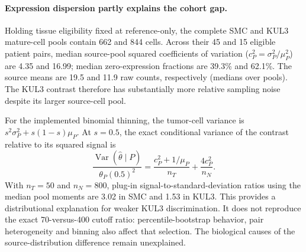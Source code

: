 \paragraph{Expression dispersion partly explains the cohort gap.}
\label{sec:cohortgap}
Holding tissue eligibility fixed at reference-only, the complete SMC and KUL3
mature-cell pools contain 662 and 844 cells. Across their 45 and 15 eligible
patient pairs, median source-pool squared coefficients of variation
($c_P^2=\sigma_P^2/\mu_P^2$) are 4.35 and 16.99; median zero-expression
fractions are 39.3\% and 62.1\%. The source means are 19.5 and 11.9 raw
counts, respectively (medians over pools). The KUL3 contrast therefore has
substantially more relative sampling noise despite its larger source-cell
pool.

For the implemented binomial thinning, the tumor-cell variance is
$s^2\sigma_P^2+s(1-s)\mu_P$. At $s=0.5$, the exact conditional variance of
the contrast relative to its squared signal is
\begin{equation}
\frac{\operatorname{Var}(\hat\theta\mid P)}{\theta_P(0.5)^2}
=\frac{c_P^2+1/\mu_P}{n_T}+\frac{4c_P^2}{n_N}.
\label{eq:relativevariance}
\end{equation}
With $n_T=50$ and $n_N=800$, plug-in signal-to-standard-deviation ratios
using the median pool moments are 3.02 in SMC and 1.53 in KUL3. This provides a distributional explanation
for weaker KUL3 discrimination. It does not reproduce the exact 70-versus-400
cutoff ratio: percentile-bootstrap behavior, pair heterogeneity and binning
also affect that selection. The biological causes of the source-distribution
difference remain unexplained.
